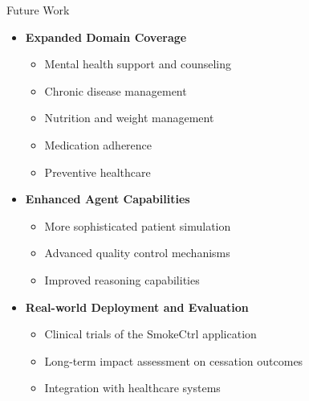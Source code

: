 
\begin{frame}{Future Work}
  \begin{itemize}
    \item \textbf{Expanded Domain Coverage}
      \begin{itemize}
        \item Mental health support and counseling
        \item Chronic disease management
        \item Nutrition and weight management
        \item Medication adherence
        \item Preventive healthcare
      \end{itemize}
    \item \textbf{Enhanced Agent Capabilities}
      \begin{itemize}
        \item More sophisticated patient simulation
        \item Advanced quality control mechanisms
        \item Improved reasoning capabilities
      \end{itemize}
    \item \textbf{Real-world Deployment and Evaluation}
      \begin{itemize}
        \item Clinical trials of the SmokeCtrl application
        \item Long-term impact assessment on cessation outcomes
        \item Integration with healthcare systems
      \end{itemize}
  \end{itemize}
\end{frame}
